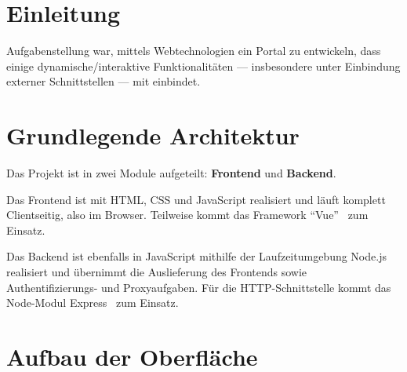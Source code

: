 \documentclass[fleqn,10pt]{SelfArx} %
\affiliation{\textsuperscript{1}\textit{Studiengang Informationstechnik, Fakultät Technik, Duale Schule Baden-Württemberg, Stuttgart}} %
\begin{document}
\flushbottom %

\maketitle %

\tableofcontents %

\thispagestyle{empty} %


\section*{Einleitung} %

Aufgabenstellung war, mittels Webtechnologien ein Portal zu entwickeln, dass einige dynamische/interaktive Funktionalitäten --- insbesondere unter Einbindung externer Schnittstellen --- mit einbindet. 

\section{Grundlegende Architektur}
Das Projekt ist in zwei Module aufgeteilt: \textbf{Frontend} und \textbf{Backend}.

Das Frontend ist mit HTML, CSS und JavaScript realisiert und läuft komplett Clientseitig, also im Browser. Teilweise kommt das Framework \enquote{Vue}~\cite{vue} zum Einsatz.

Das Backend ist ebenfalls in JavaScript mithilfe der Laufzeitumgebung Node.js~\cite{nodejs} realisiert und übernimmt die Auslieferung des Frontends sowie Authentifizierungs- und Proxyaufgaben. Für die HTTP-Schnittstelle kommt das Node-Modul Express~\cite{express} zum Einsatz.
\section{Aufbau der Oberfläche}
\end{document}
